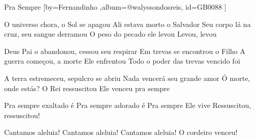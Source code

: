\beginsong
{Pra Sempre %
}[by={Fernandinho  %
},album={@walyssondosreis},
id={GB0088 %
}] 

\beginverse* 
O universo chora, o Sol se apagou
Ali estava morto o Salvador
Seu corpo lá na cruz, seu sangue derramou
O peso do pecado ele levou
Levou, levou
\endverse

\beginverse* 
Deus Pai o abandonou, cessou seu respirar
Em trevas se encontrou o Filho
A guerra começou, a morte Ele enfrentou
Todo o poder das trevas vencido foi
\endverse

\beginverse* 
A terra estremeceu, sepulcro se abriu
Nada vencerá seu grande amor
Ó morte, onde estás? O Rei ressuscitou
Ele venceu pra sempre
\endverse

\beginchorus
Pra sempre exaltado é
Pra sempre adorado é
Pra sempre Ele vive
Ressuscitou, ressuscitou!
\endchorus

\beginverse* 
Cantamos aleluia! Cantamos aleluia!
Cantamos aleluia! O cordeiro venceu!
\endverse

\begin{comment}
\lstset{basicstyle=\scriptsize\bf} %
\tab{Solo 1}
\begin{lstlisting}
E|-----------------------------------------------------|
B|-----------------------------------------------------|
G|-----------------------------------------------------|
D|-----------------------------------------------------|
A|-----------------------------------------------------|
E|-----------------------------------------------------|
\end{lstlisting}
\end{comment}
\vspace{2em}
%
%
% 
% 
\endsong
\begin{comment}

\end{comment}